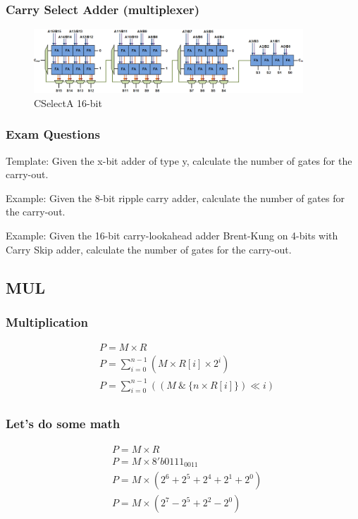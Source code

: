 \begin{frame}
    \frametitle{Carry Select Adder (multiplexer)}
    \begin{figure}
        \centering
        \includegraphics[width=0.9\textwidth]{media/Carry-select-adder-fixed-size.png}
        \caption{CSelectA 16-bit}
    \end{figure}
\end{frame}

\begin{frame}
    \frametitle{Exam Questions}
 Template: Given the x-bit adder of type y, calculate the number of gates for the carry-out.

 Example: Given the 8-bit ripple carry adder, calculate the number of gates for the carry-out.

 Example: Given the 16-bit carry-lookahead adder Brent-Kung on 4-bits with Carry Skip adder, calculate the number of gates for the carry-out.
\end{frame}

\subsection{MUL}

\begin{frame}
    \frametitle{Multiplication}
    \begin{equation}
        \begin{aligned}
            &P = M \times R\\
            &P=\sum_{i=0}^{n-1} (M \times R[i] \times 2^i)\\
            &P=\sum_{i=0}^{n-1} ((M \ \& \ \{n \times R[i]\}) \ll i)\\
        \end{aligned}
    \end{equation}
\end{frame}

\begin{frame}
    \frametitle{Let's do some math}
    \begin{equation}
        \begin{aligned}
            &P = M \times R\\
            &P = M \times 8'b0111_0011\\
            &P = M \times (2^6 + 2^5 + 2^4 + 2^1 + 2^0)\\
            &P = M \times (2^7 - 2^5 + 2^2 - 2^0)\\
        \end{aligned}
    \end{equation}
\end{frame}

